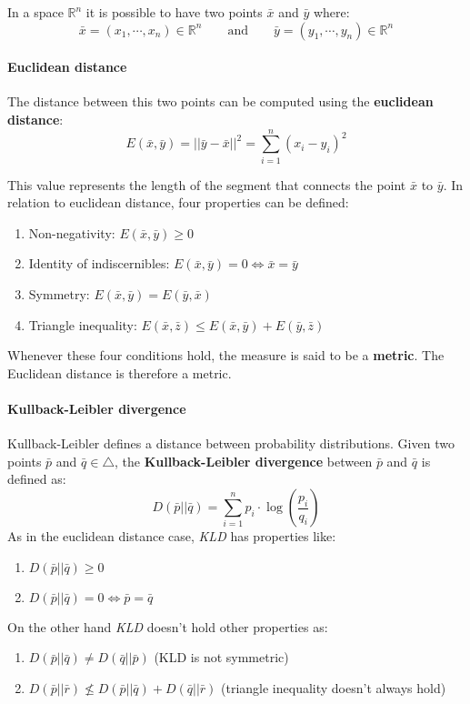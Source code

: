 In a space $\mathbb{R}^n$ it is possible to have two points $\bar{x}$ and $\bar{y}$ where:
$$\bar{x} = (x_1, \cdots, x_n) \in \mathbb{R}^n \qquad \text{and} \qquad \bar{y} = (y_1, \cdots, y_n) \in \mathbb{R}^n$$


\paragraph{Euclidean distance} The distance between this two points can be computed using the \textbf{euclidean distance}:
$$E(\bar{x}, \bar{y}) = || \bar{y} - \bar{x}||^2 = \sum_{i=1}^n (x_i - y_i)^2$$


This value represents the length of the segment that connects the point $\bar{x}$ to $\bar{y}$. In relation to euclidean distance, four properties can be defined:
\begin{enumerate}
	\item Non-negativity: $E(\bar{x}, \bar{y}) \geq 0$
	\item Identity of indiscernibles: $E(\bar{x}, \bar{y}) = 0 \iff \bar{x} = \bar{y}$ 
	\item Symmetry: $E(\bar{x}, \bar{y}) = E(\bar{y}, \bar{x})$
	\item Triangle inequality: $E(\bar{x}, \bar{z}) \leq E(\bar{x}, \bar{y}) + E(\bar{y}, \bar{z})$
\end{enumerate}
Whenever these four conditions hold, the measure is said to be a \textbf{metric}. The Euclidean distance is therefore a metric.

\paragraph{Kullback-Leibler divergence} 
Kullback-Leibler defines a distance between probability distributions. 
Given two points $\bar{p}$ and $\bar{q} \in \bigtriangleup$, the \textbf{Kullback-Leibler divergence} between $\bar{p}$ and $\bar{q}$ is defined as:
$$D(\bar{p} || \bar{q}) = \sum_{i=1}^n p_i \cdot \log\left( \frac{p_i}{q_i}\right)$$
As in the euclidean distance case, \textit{KLD} has properties like:
\begin{enumerate}
	\item $D(\bar{p} || \bar{q}) \geq 0$
	\item $D(\bar{p} || \bar{q}) = 0 \iff \bar{p} = \bar{q}$
\end{enumerate}
On the other hand \textit{KLD} doesn't hold other properties as:
\begin{enumerate}
	\item $D(\bar{p} || \bar{q}) \neq D(\bar{q} || \bar{p})$ (KLD is not symmetric)
	\item $D(\bar{p} || \bar{r}) \nleq D(\bar{p} || \bar{q}) + D(\bar{q} || \bar{r})$ (triangle inequality doesn't always hold) 
\end{enumerate}
\par \bigskip \noindent

